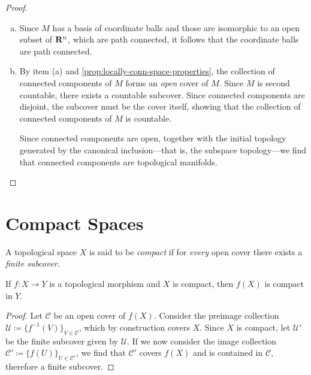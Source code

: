 \begin{proof}
\begin{enumerate}[(a)]\setlength\itemsep{0em}
\item Since \(M\) has a basis of coordinate balls and those are isomorphic to an
  open subset of \(\mathbf{R}^n\), which are path connected, it follows that the
  coordinate balls are path connected.

\item By item (a) and \cref{prop:locally-conn-space-properties}, the collection
  of connected components of \(M\) forms an \emph{open} cover of \(M\). Since
  \(M\) is second countable, there exists a countable subcover. Since connected
  components are disjoint, the subcover must be the cover itself, showing that
  the collection of connected components of \(M\) is countable.

  Since connected components are open, together with the initial topology
  generated by the canonical inclusion---that is, the subspace topology---we
  find that connected components are topological manifolds.
\end{enumerate}
\end{proof}

\section{Compact Spaces}

\begin{definition}
\label{def:compact-space}
A topological space \(X\) is said to be \emph{compact} if for \emph{every} open
cover there exists a \emph{finite subcover}.
\end{definition}

\begin{proposition}
\label{prop:image-of-compact-is-compact}
If \(f: X \to Y\) is a topological morphism and \(X\) is compact, then \(f(X)\)
is compact in \(Y\).
\end{proposition}

\begin{proof}
Let \(\mathcal{C}\) be an open cover of \(f(X)\). Consider the preimage
collection \(\mathcal{U} \coloneq \{f^{-1}(V)\}_{V \in \mathcal{C}}\), which by
construction covers \(X\). Since \(X\) is compact, let \(\mathcal{U}'\) be the
finite subcover given by \(\mathcal{U}\). If we now consider the image
collection \(\mathcal{C}' \coloneq \{f(U)\}_{U \in \mathcal{C}'}\), we find that
\(\mathcal{C}'\) covers \(f(X)\) and is contained in \(\mathcal{C}\), therefore
a finite subcover.
\end{proof}

